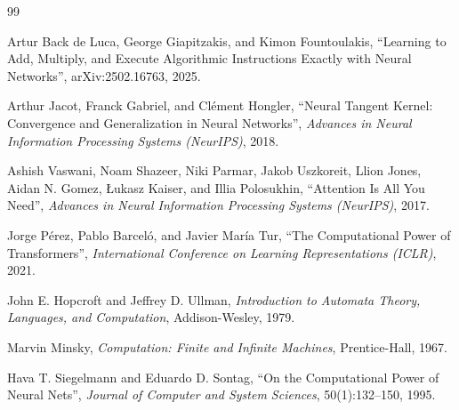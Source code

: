 \begin{thebibliography}{99}
     Artur Back de Luca, George Giapitzakis, and Kimon Fountoulakis, ``Learning to Add, Multiply, and Execute Algorithmic Instructions Exactly with Neural Networks'', arXiv:2502.16763, 2025.

     Arthur Jacot, Franck Gabriel, and Cl\'ement Hongler, ``Neural Tangent Kernel: Convergence and Generalization in Neural Networks'', \emph{Advances in Neural Information Processing Systems (NeurIPS)}, 2018.

     Ashish Vaswani, Noam Shazeer, Niki Parmar, Jakob Uszkoreit, Llion Jones, Aidan N. Gomez, \L{}ukasz Kaiser, and Illia Polosukhin, ``Attention Is All You Need'', \emph{Advances in Neural Information Processing Systems (NeurIPS)}, 2017.

     Jorge P\'erez, Pablo Barcel\'o, and Javier Mar\'ia Tur, ``The Computational Power of Transformers'', \emph{International Conference on Learning Representations (ICLR)}, 2021.

     John E. Hopcroft and Jeffrey D. Ullman, \emph{Introduction to Automata Theory, Languages, and Computation}, Addison-Wesley, 1979.

     Marvin Minsky, \emph{Computation: Finite and Infinite Machines}, Prentice-Hall, 1967.

     Hava T. Siegelmann and Eduardo D. Sontag, ``On the Computational Power of Neural Nets'', \emph{Journal of Computer and System Sciences}, 50(1):132--150, 1995.

\end{thebibliography}